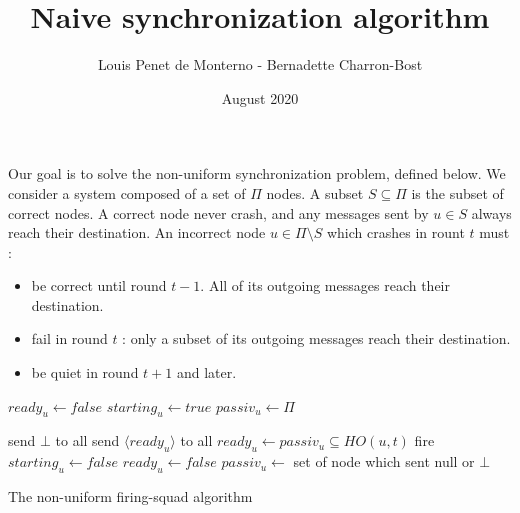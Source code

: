 \documentclass{article}
\title{Naive synchronization algorithm}
\date{August 2020}
\author{Louis Penet de Monterno - Bernadette Charron-Bost}
\begin{document}
Our goal is to solve the non-uniform synchronization problem, defined below.
We consider a system composed of a set of $\Pi$ nodes.
A subset $S \subseteq \Pi$ is the subset of correct nodes.
A correct node never crash, and any messages sent by $u \in S$ always reach their destination.
An incorrect node $u \in \Pi \setminus S$ which crashes in rount $t$ must :
\begin{itemize}
	\item be correct until round $t-1$. All of its outgoing messages reach their destination.
	\item fail in round $t$ : only a subset of its outgoing messages reach their destination.
	\item be quiet in round $t+1$ and later.
\end{itemize}



\begin{algorithm}[htb]\label{algo:code}
\begin{distribalgo}[1]
\BLANK {}
	\STATE $ready_u \leftarrow false$
	\STATE $starting_u \leftarrow true$
	\STATE $passiv_u \leftarrow \Pi$

\ENDINDENT \BLANK

			\STATE send $\bot$ to all
		\ELSE
			\STATE send $\langle ready_u \rangle$ to all
		\ENDIF
	\ENDINDENT \BLANK
		\STATE $ready_u \leftarrow passiv_u \subseteq HO(u, t)$
			\STATE fire 
		\ENDIF
			\STATE $starting_u \leftarrow false$ 
			\STATE $ready_u \leftarrow false$ 
		\ENDIF
		\STATE $passiv_u \leftarrow $ set of node which sent null or $\bot$
	\ENDINDENT 
\ENDINDENT 

\caption{The non-uniform firing-squad algorithm} \label{algo:R}
\end{distribalgo}

\end{algorithm}
\end{document}
